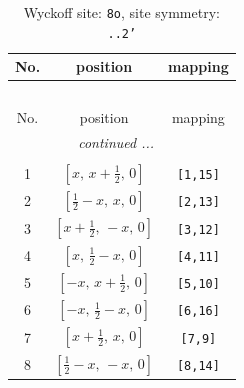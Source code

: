 \documentclass[fleqn,8pt]{jsarticle}
\begin{document}
\begin{longtable}{ccc}
\caption{Wyckoff site: {\tt 8o}, site symmetry: {\tt ..2'}}
 \\
 \hline \hline
No. & position & mapping \\ \hline \endfirsthead

\multicolumn{2}{l}{\tablename\ \thetable{}} \\
 \hline \hline
No. & position & mapping \\ \hline \endhead

 \hline \hline
\multicolumn{2}{r}{\footnotesize\it continued ...} \\ \endfoot

 \hline \hline
\multicolumn{2}{r}{} \\ \endlastfoot

1 & $\left[ x,\, x + \frac{1}{2},\, 0 \right]$ & {\tt [1,15]} \\ \hline
2 & $\left[ \frac{1}{2} - x,\, x,\, 0 \right]$ & {\tt [2,13]} \\ \hline
3 & $\left[ x + \frac{1}{2},\, - x,\, 0 \right]$ & {\tt [3,12]} \\ \hline
4 & $\left[ x,\, \frac{1}{2} - x,\, 0 \right]$ & {\tt [4,11]} \\ \hline
5 & $\left[ - x,\, x + \frac{1}{2},\, 0 \right]$ & {\tt [5,10]} \\ \hline
6 & $\left[ - x,\, \frac{1}{2} - x,\, 0 \right]$ & {\tt [6,16]} \\ \hline
7 & $\left[ x + \frac{1}{2},\, x,\, 0 \right]$ & {\tt [7,9]} \\ \hline
8 & $\left[ \frac{1}{2} - x,\, - x,\, 0 \right]$ & {\tt [8,14]} \\
\end{longtable}
\renewcommand{\arraystretch}{1.2}
\end{document}
